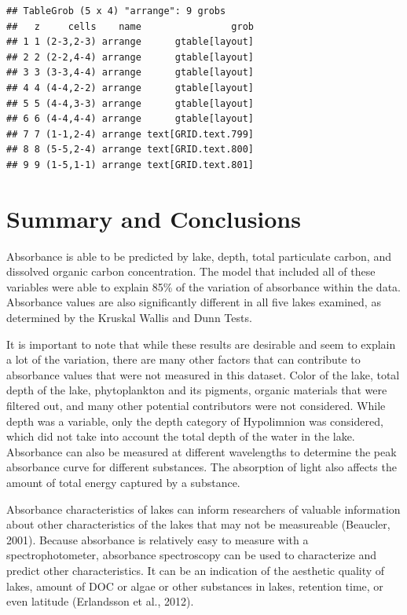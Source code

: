 \documentclass[12pt,]{article}
\begin{document}
\begin{verbatim}
## TableGrob (5 x 4) "arrange": 9 grobs
##   z     cells    name                grob
## 1 1 (2-3,2-3) arrange      gtable[layout]
## 2 2 (2-2,4-4) arrange      gtable[layout]
## 3 3 (3-3,4-4) arrange      gtable[layout]
## 4 4 (4-4,2-2) arrange      gtable[layout]
## 5 5 (4-4,3-3) arrange      gtable[layout]
## 6 6 (4-4,4-4) arrange      gtable[layout]
## 7 7 (1-1,2-4) arrange text[GRID.text.799]
## 8 8 (5-5,2-4) arrange text[GRID.text.800]
## 9 9 (1-5,1-1) arrange text[GRID.text.801]
\end{verbatim}

\newpage

\section{Summary and Conclusions}\label{summary-and-conclusions}

Absorbance is able to be predicted by lake, depth, total particulate
carbon, and dissolved organic carbon concentration. The model that
included all of these variables were able to explain 85\% of the
variation of absorbance within the data. Absorbance values are also
significantly different in all five lakes examined, as determined by the
Kruskal Wallis and Dunn Tests.

It is important to note that while these results are desirable and seem
to explain a lot of the variation, there are many other factors that can
contribute to absorbance values that were not measured in this dataset.
Color of the lake, total depth of the lake, phytoplankton and its
pigments, organic materials that were filtered out, and many other
potential contributors were not considered. While depth was a variable,
only the depth category of Hypolimnion was considered, which did not
take into account the total depth of the water in the lake. Absorbance
can also be measured at different wavelengths to determine the peak
absorbance curve for different substances. The absorption of light also
affects the amount of total energy captured by a substance.

Absorbance characteristics of lakes can inform researchers of valuable
information about other characteristics of the lakes that may not be
measureable (Beaucler, 2001). Because absorbance is relatively easy to
measure with a spectrophotometer, absorbance spectroscopy can be used to
characterize and predict other characteristics. It can be an indication
of the aesthetic quality of lakes, amount of DOC or algae or other
substances in lakes, retention time, or even latitude (Erlandsson et
al., 2012).
\end{document}
